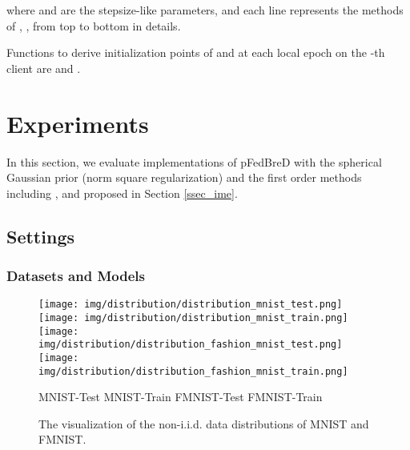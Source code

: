 \documentclass{article}
\begin{document}
where  and  are the stepsize-like parameters, and each line represents the methods of , ,  from top to bottom in details.

Functions to derive initialization points of  and  at each local epoch on the -th client are  and .
\section{Experiments}
\label{sec_exp}

In this section, we evaluate implementations of pFedBreD with the spherical Gaussian prior (norm square regularization) and the first order methods including ,  and  proposed in Section \ref{ssec_ime}.

\subsection{Settings}
\label{ssec_exps}

\subsubsection{Datasets and Models}
\label{sssec_dm}

\begin{table}[t]
    \centering
    \caption{Datasets and models.}
    \label{tbl_tasks}
\end{table}

\begin{figure}
    \centering
    \texttt{[image: img/distribution/distribution\_mnist\_test.png]}
    \texttt{[image: img/distribution/distribution\_mnist\_train.png]}  
    \texttt{[image: img/distribution/distribution\_fashion\_mnist\_test.png]} \texttt{[image: img/distribution/distribution\_fashion\_mnist\_train.png]}
    \begin{center}
        \footnotesize 
        MNIST-Test \qquad\qquad\qquad\qquad MNIST-Train \qquad\qquad\qquad\qquad
        FMNIST-Test \qquad\qquad\qquad\qquad FMNIST-Train
    \end{center}
    \caption{The visualization of the non-i.i.d. data distributions of MNIST and FMNIST.}
    \label{fig_niid}
\end{figure}
\end{document}
